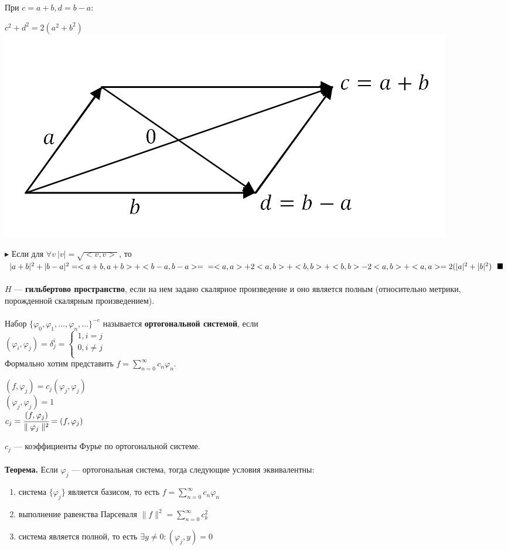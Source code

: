 \documentclass[12pt]{article}
\theoremstyle{definition}
\numberwithin{equation}{section}
\begin{document}
	При $c = a+b, d = b-a:$ \begin{center}$c^2+d^2 = 2(a^2+b^2)$\\
		\includegraphics[scale=0.55]{l5_11.png}\end{center}
	$\blacktriangleright $ Если для $\forall v ~|v| = \sqrt{<v, v>}$, то $|a+b|^2+|b-a|^2 = <a+b, a+b> + <b-a, b-a> = \\=<a, a> + 2<a, b> + <b, b> +<b, b> - 2<a, b> + <a, a> = 2(|a|^2 + |b|^2)~~ \blacksquare$\\
	\\
	$H$ --- \textbf{гильбертово пространство}, если на нем задано скалярное произведение и оно является полным (относительно метрики, порожденной скалярным произведением).\\
	\\
	Набор $\{ \varphi_0, \varphi_1,...,\varphi_n,...\}^{-e}$ называется \textbf{ортогональной системой}, если \\$(\varphi_i, \varphi_j) = \delta_j^i = 
	\left\{  
	\begin{array}{lcl}  
	1, i = j \\  
	0, i \neq j \\
	\end{array}   
	\right.  
	$\\
	Формально хотим представить $f = \sum\limits_{n=0}^{\infty} c_n \varphi_n$.\begin{center}
		$(f, \varphi_j) = c_j(\varphi_j, \varphi_j)$\\ 
		$(\varphi_j, \varphi_j) = 1$\\ 
		$c_j = \cfrac{(f, \varphi_j)}{\parallel \varphi_j \parallel^2} = (f, \varphi_j)$\end{center} $c_j$ --- коэффициенты Фурье по ортогональной системе.\\ \\
	\textbf{Теорема.}
	Если $\varphi_j$ --- ортогональная система, тогда следующие условия эквивалентны:\begin{enumerate}
		\item система $\{\varphi_j\}$ является базисом, то есть $f = \sum\limits_{n=0}^{\infty}c_n \varphi_n$
		\item выполнение равенства Парсеваля $\parallel f \parallel^2 = \sum\limits_{n=0}^{\infty}c_k^2$
		\item система является полной, то есть $\exists y \neq 0: (\varphi_j, y) = 0$
	\end{enumerate}
\end{document}
